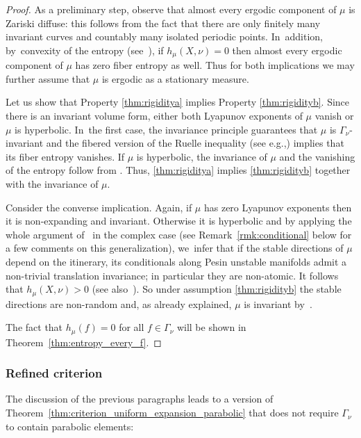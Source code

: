 \documentclass[11pt]{article}
\newcommand{\eg}{e.g.,\xspace}
\theoremstyle{plain}
\theoremstyle{definition}
\numberwithin{equation}{section}
\begin{document}
\begin{proof}
As a preliminary step, observe that almost every ergodic component of $\mu$ is
Zariski diffuse: this follows from the fact that there are
only finitely many invariant curves and countably many isolated periodic points. In~addition, by~convexity
of the entropy (see~\cite[Prop.\,4.3.16]{katok-hasselblatt}), if $h_\mu(X, \nu)=0$ then almost every ergodic component of $\mu$ has zero fiber entropy as well.
Thus for both implications we may further assume that $\mu$ is ergodic as a stationary measure.

Let us show that Property \eqref{thm:rigiditya} implies Property \eqref{thm:rigidityb}. Since there is an invariant volume form, either
both Lyapunov exponents of $\mu$ vanish or $\mu$ is hyperbolic. In~the first case,
the invariance principle guarantees that $\mu$ is $\Gamma_\nu$-invariant and
the fibered version of the Ruelle inequality (see \eg \cite[\S 7]{stiffness}) implies that its fiber entropy
vanishes. If $\mu$ is hyperbolic, the invariance of $\mu$ and the vanishing of the entropy follow from
\cite[Th.\,9.1]{stiffness}.
Thus, \eqref{thm:rigiditya} implies \eqref{thm:rigidityb} together with the invariance of $\mu$.

Consider the converse implication. Again, if $\mu$ has zero Lyapunov exponents then it is non-expanding and
invariant. Otherwise it is hyperbolic and
by applying the whole argument of~\cite{br} in the complex case (see Remark~\ref{rmk:conditional} below for a few comments on this generalization), we~infer that if the stable directions of
$\mu$ depend on the itinerary, its conditionals along Pesin unstable manifolds admit a non-trivial
translation invariance; in particular they are non-atomic. It follows that $h_\mu(X, \nu)>0$
(see also~\cite[Rem.\,9.2]{stiffness}). So under assumption \eqref{thm:rigidityb} the stable directions are non-random and, as
already explained, $\mu$ is invariant by~\cite[Th.\,9.1]{stiffness}.

The fact that $h_\mu(f)=0$ for all $f\in \Gamma_\nu$ will be shown in
Theorem~\ref{thm:entropy_every_f}.
\end{proof}

\subsubsection{Refined criterion}

The discussion of the previous paragraphs leads to a version of
Theorem~\ref{thm:criterion_uniform_expansion_parabolic} that does not require $\Gamma_\nu$ to contain parabolic elements:
\end{document}
